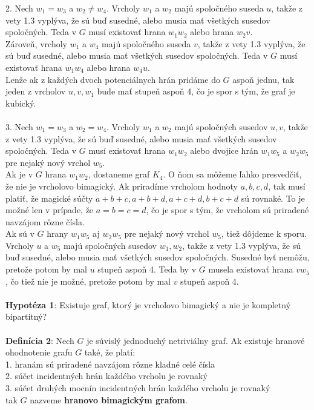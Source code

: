 \documentclass[12pt]{article}
\begin{document}
2. Nech $w_1 = w_3$ a $w_2 \neq w_4$. Vrcholy $w_1$ a $w_2$ majú spoločného suseda $u$, takže z vety 1.3 vyplýva, že sú buď susedné, alebo musia mať všetkých susedov spoločných. Teda v $G$ musí existovať hrana $w_1 w_2$ alebo hrana $w_2 v$. \\

Zároveň, vrcholy $w_1$ a $w_4$ majú spoločného suseda $v$, takže z vety 1.3 vyplýva, že sú buď susedné, alebo musia mať všetkých susedov spoločných. Teda v $G$ musí existovať hrana $w_1 w_4$ alebo hrana $w_4 u$. \\

Lenže ak z každých dvoch potenciálnych hrán pridáme do $G$ aspoň jednu, tak jeden z vrcholov $u, v, w_1$ bude mať stupeň aspoň 4, čo je spor s tým, že graf je kubický. \\\\

3. Nech $w_1 = w_3$ a $w_2 = w_4$. Vrcholy $w_1$ a $w_2$ majú spoločných susedov $u,v$, takže z vety 1.3 vyplýva, že sú buď susedné, alebo musia mať všetkých susedov spoločných. Teda v $G$ musí existovať hrana $w_1 w_2$ alebo dvojice hrán $w_1 w_5$ a $w_2 w_5$ pre nejaký nový vrchol $w_5$. \\

Ak je v $G$ hrana $w_1 w_2$, dostaneme graf $K_4$. O ňom sa môžeme ľahko presvedčiť, že nie je vrcholovo bimagický. Ak priradíme vrcholom hodnoty $a,b,c,d$, tak musí platiť, že magické súčty $a+b+c, a+b+d, a+c+d, b+c+d$ sú rovnaké. To je možné len v prípade, že $a = b = c = d$, čo je spor s tým, že vrcholom sú priradené navzájom rôzne čísla. \\

Ak sú v $G$ hrany $w_1 w_5$ aj $w_2 w_5$ pre nejaký nový vrchol $w_5$, tiež dôjdeme k sporu. Vrcholy $u$ a $w_5$ majú spoločných susedov $w_1, w_2$, takže z vety 1.3 vyplýva, že sú buď susedné, alebo musia mať všetkých susedov spoločných. Susedné byť nemôžu, pretože potom by mal $u$ stupeň aspoň 4. Teda by v $G$ musela existovať hrana $v w_5$, čo tiež nie je možné, pretože potom by mal $v$ stupeň aspoň 4. \\\\

\textbf{Hypotéza 1}: Existuje graf, ktorý je vrcholovo bimagický a nie je kompletný bipartitný? \\\\

\textbf{Definícia 2}: Nech $G$ je súvislý jednoduchý netriviálny graf. Ak existuje hranové ohodnotenie grafu $G$ také, že platí: \\
1. hranám sú priradené navzájom rôzne kladné celé čísla \\
2. súčet incidentných hrán každého vrcholu je rovnaký \\
3. súčet druhých mocnín incidentných hrán každého vrcholu je rovnaký \\
tak $G$ nazveme \textbf{hranovo bimagickým grafom}. \\
\end{document}
